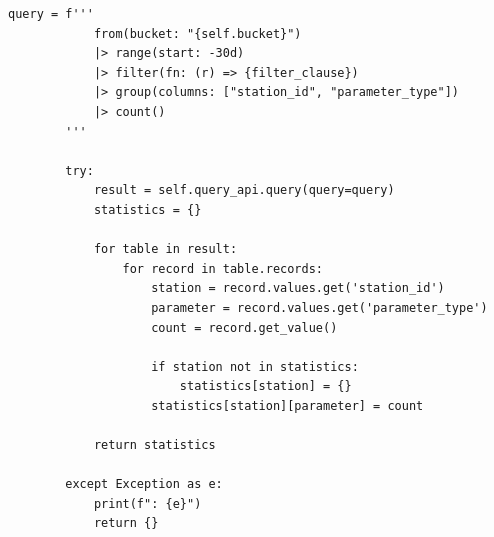 \begin{lstlisting}[style=python]
        query = f'''
            from(bucket: "{self.bucket}")
            |> range(start: -30d)
            |> filter(fn: (r) => {filter_clause})
            |> group(columns: ["station_id", "parameter_type"])
            |> count()
        '''
        
        try:
            result = self.query_api.query(query=query)
            statistics = {}
            
            for table in result:
                for record in table.records:
                    station = record.values.get('station_id')
                    parameter = record.values.get('parameter_type')
                    count = record.get_value()
                    
                    if station not in statistics:
                        statistics[station] = {}
                    statistics[station][parameter] = count
            
            return statistics
        
        except Exception as e:
            print(f": {e}")
            return {}
\end{lstlisting}

\hypertarget{section-95}{%
\subsubsection{}\label{section-95}}

